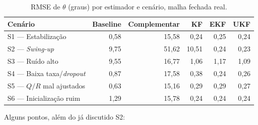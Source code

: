\documentclass[brazil, 12pt]{article}
\begin{document}
\begin{table}[H]
\centering
\small
\begin{tabular}{@{}l r r r r r@{}}
\hline
\textbf{Cenário} & \textbf{Baseline} & \textbf{Complementar} & \textbf{KF} & \textbf{EKF} & \textbf{UKF} \\
\hline
S1 — Estabilização        &  0,58 & 15,58 &  0,24 & 0,25 & 0,24 \\
S2 — \emph{Swing-up}      &  9,75 & 51,62 & 10,51 & 0,24 & 0,23 \\
S3 — Ruído alto            &  9,55 & 16,77 &  1,06 & 1,17 & 1,09 \\
S4 — Baixa taxa/\emph{dropout} &  0,87 & 17,58 &  0,38 & 0,24 & 0,26 \\
S5 — $Q/R$ mal ajustados   &  0,63 & 15,16 &  0,29 & 0,29 & 0,27 \\
S6 — Inicialização ruim    &  1,29 & 15,78 &  0,24 & 0,24 & 0,24 \\
\hline
\end{tabular}
\caption{RMSE de $\theta$ (graus) por estimador e cenário, malha fechada real.}
\label{tab:rmse-final}
\end{table}

Alguns pontos, além do já discutido S2:
\end{document}
